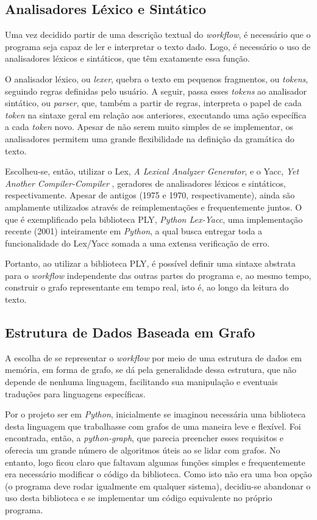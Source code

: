 \documentclass[a4paper,11pt]{article}
\begin{document}
  	
  	\newpage	
  	\subsection{Analisadores Léxico e Sintático}
  		Uma vez decidido partir de uma descrição textual do \emph{workflow}, é necessário que o programa seja capaz de ler e interpretar o texto dado. Logo, é necessário o uso de analisadores léxicos e sintáticos, que têm exatamente essa função.

  		O analisador léxico, ou \emph{lexer}, quebra o texto em pequenos fragmentos, ou \emph{tokens}, seguindo regras definidas pelo usuário. A seguir, passa esses \emph{tokens} ao analisador sintático, ou \emph{parser}, que, também a partir de regras, interpreta o papel de cada \emph{token} na sintaxe geral em relação aos anteriores, executando uma ação específica a cada \emph{token} novo. Apesar de não serem muito simples de se implementar, os analisadores permitem uma grande flexibilidade na definição da gramática do texto.

  		Escolheu-se, então, utilizar o Lex, \emph{A Lexical Analyzer Generator}, e o Yacc, \emph{Yet Another Compiler-Compiler} \cite{web:lexyacc}, geradores de analisadores léxicos e sintáticos, respectivamente. Apesar de antigos (1975 e 1970, respectivamente), ainda são amplamente utilizados através de reimplementações e frequentemente juntos. O que é exemplificado pela biblioteca PLY, \emph{Python Lex-Yacc}, uma implementação recente (2001) inteiramente em \emph{Python}, a qual busca entregar toda a funcionalidade do Lex/Yacc somada a uma extensa verificação de erro.

  		Portanto, ao utilizar a biblioteca PLY, é possível definir uma sintaxe abstrata para o \emph{workflow} independente das outras partes do programa e, ao mesmo tempo, construir o grafo representante em tempo real, isto é, ao longo da leitura do texto. 

  	\subsection{Estrutura de Dados Baseada em Grafo}
  		A escolha de se representar o \emph{workflow} por meio de uma estrutura de dados em memória, em forma de grafo, se dá pela generalidade dessa estrutura, que não depende de nenhuma linguagem, facilitando sua manipulação e eventuais traduções para linguagens específicas. 

  		Por o projeto ser em \emph{Python}, inicialmente se imaginou necessária uma biblioteca desta linguagem que trabalhasse com grafos de uma maneira leve e flexível. Foi encontrada, então, a \emph{python-graph}, que parecia preencher esses requisitos e oferecia um grande número de algoritmos úteis ao se lidar com grafos. No entanto, logo ficou claro que faltavam algumas funções simples e frequentemente era necessário modificar o código da biblioteca. Como isto não era uma boa opç\~ao (o programa deve rodar igualmente em qualquer sistema), decidiu-se abandonar o uso desta biblioteca e se implementar um c\'odigo equivalente no pr\'oprio programa.
\end{document}
